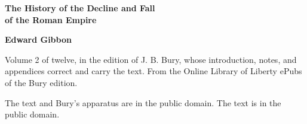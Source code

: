 \documentclass[11pt,letterpaper]{article}
\begin{document}
\color{ink}

\begin{titlepage}
\centering
\vspace*{4em}
{\LARGE\bfseries\color{heading} The History of the Decline and Fall\\[0.3em]of the Roman Empire\par}
\vspace{2em}
{\Large\bfseries\color{heading} Edward Gibbon\par}
\vspace{2.5em}
{\itshape\color{subhead}\parbox{0.8\linewidth}{\centering Volume 2 of twelve, in the edition of J. B. Bury, whose introduction, notes, and appendices correct and carry the text. From the Online Library of Liberty ePubs of the Bury edition.\par}}
\vfill
{\small The text and Bury's apparatus are in the public domain. The text is in the public domain.\par}
\vspace{2em}
\end{titlepage}

\tableofcontents


\end{document}
